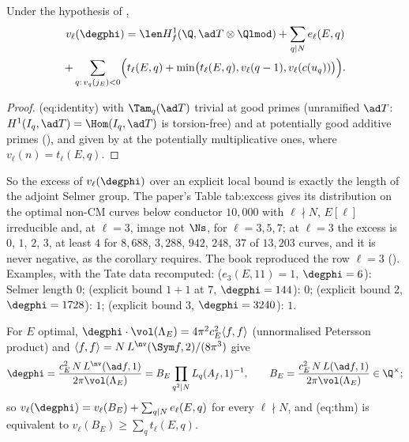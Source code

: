 \begin{sloppypar}
\begin{corollary}\label{cor:paper:explicit}
Under the hypothesis of ,
\begin{multline*}
v_\ell(\degphi)=\len H^1_f(\Q,\ad T\otimes\Qlmod)+\sum_{q\mid N}e_\ell(E,q)\\
+\sum_{q:\,v_q(j_E)<0}\Bigl(t_\ell(E,q)+\min\bigl(t_\ell(E,q),v_\ell(q-1),v_\ell(c(u_q))\bigr)\Bigr).
\end{multline*}
\end{corollary}

\begin{proof}
(eq:identity) with $\Tam_q(\ad T)$ trivial at good primes (unramified $\ad T$: $H^1(I_q,\ad T)=\Hom(I_q,\ad T)$ is torsion-free) and at potentially good additive primes
(), and given by  at the potentially multiplicative ones, where $v_\ell(n)=t_\ell(E,q)$.
\end{proof}

\noindent So the excess of $v_\ell(\degphi)$ over an explicit local bound is exactly the length of the adjoint Selmer group. The paper's Table tab:excess gives its
distribution on the optimal non-CM curves below conductor $10{,}000$ with $\ell\nmid N$, $E[\ell]$ irreducible and, at $\ell=3$, image not $\Ns$, for $\ell=3,5,7$; at $\ell=3$ the
excess is $0$, $1$, $2$, $3$, at least $4$ for $8{,}688$, $3{,}288$, $942$, $248$, $37$ of $13{,}203$ curves, and it is never negative, as the corollary requires. The book reproduced
the row $\ell=3$ (). Examples, with the
Tate data recomputed:  ($e_3(E,11)=1$, $\degphi=6$): Selmer length $0$;  (explicit bound $1+1$ at $7$, $\degphi=144$): $0$;  (explicit bound $2$,
$\degphi=1728$): $1$;  (explicit bound $3$, $\degphi=3240$): $1$.

\begin{proposition}\label{prop:paper:degree}
For $E$ optimal, $\degphi\cdot\vol(\Lambda_E)=4\pi^2c_E^2\langle f,f\rangle$ (unnormalised Petersson product) and $\langle f,f\rangle=N\,L^{\nv}(\Sym f,2)/(8\pi^3)$ give
\[
\degphi=\frac{c_E^2\,N\,L^{\nv}(\ad f,1)}{2\pi\vol(\Lambda_E)}=B_E\prod_{q^2\mid N}L_q(A_f,1)^{-1},\qquad B_E=\frac{c_E^2\,N\,L(\ad f,1)}{2\pi\vol(\Lambda_E)}\in\Q^\times;
\]
so $v_\ell(\degphi)=v_\ell(B_E)+\sum_{q\mid N}e_\ell(E,q)$ for every $\ell\nmid N$, and (eq:thm) is equivalent to $v_\ell(B_E)\ge\sum_qt_\ell(E,q)$.
\end{proposition}


\end{sloppypar}
